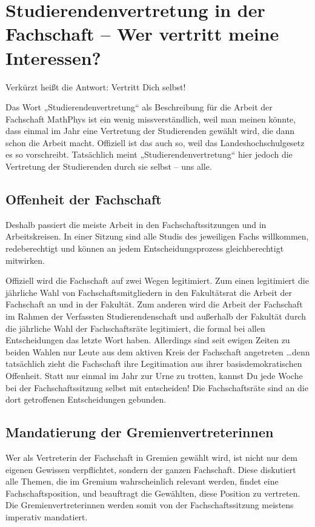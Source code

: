 \section[Studierendenvertretung in der Fachschaft]{Studierendenvertretung in der Fachschaft -- Wer vertritt meine Interessen?}

Verkürzt heißt die Antwort: Vertritt Dich selbst!

Das Wort „Studierendenvertretung“ als Beschreibung für die Arbeit der Fachschaft MathPhys ist ein wenig missverständlich, weil man meinen könnte, dass einmal im Jahr eine Vertretung der Studierenden gewählt wird, die dann schon die Arbeit macht. Offiziell ist das auch so, weil das Landeshochschulgesetz es so vorschreibt. Tatsächlich meint „Studierendenvertretung“ hier jedoch die Vertretung der Studierenden durch sie selbst -- uns alle.

\subsection{Offenheit der Fachschaft}

Deshalb passiert die meiste Arbeit in den Fachschaftssitzungen und in Arbeitskreisen. In einer Sitzung sind alle Studis des jeweiligen Fachs willkommen, redeberechtigt und können an jedem Entscheidungsprozess gleichberechtigt mitwirken.

Offiziell wird die Fachschaft auf zwei Wegen legitimiert. Zum einen legitimiert die jährliche Wahl von Fachschaftsmitgliedern in den Fakultätsrat die Arbeit der Fachschaft an und in der Fakultät. Zum anderen wird die Arbeit der Fachschaft im Rahmen der Verfassten Studierendenschaft und außerhalb der Fakultät durch die jährliche Wahl der Fachschaftsräte legitimiert, die formal bei allen Entscheidungen das letzte Wort haben. Allerdings sind seit ewigen Zeiten zu beiden Wahlen nur Leute aus dem aktiven Kreis der Fachschaft angetreten \dots denn tatsächlich zieht die Fachschaft ihre Legitimation aus ihrer basisdemokratischen Offenheit. Statt nur einmal im Jahr zur Urne zu trotten, kannst Du jede Woche bei der Fachschaftssitzung selbst mit entscheiden! Die Fachschaftsräte sind an die dort getroffenen Entscheidungen gebunden.

\subsection{Mandatierung der Gremienvertreterinnen}
Wer als Vertreterin der Fachschaft in Gremien gewählt wird, ist nicht nur dem eigenen Gewissen verpflichtet, sondern der ganzen Fachschaft. Diese diskutiert alle Themen, die im Gremium wahrscheinlich relevant werden, findet eine Fachschaftsposition, und beauftragt die Gewählten, diese Position zu vertreten. Die Gremienvertreterinnen werden somit von der Fachschaftssitzung meistens imperativ mandatiert.

